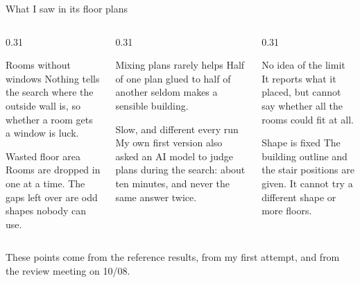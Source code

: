 \documentclass[9pt,aspectratio=169]{beamer}
\begin{document}
\begin{frame}{What I saw in its floor plans}
\begin{columns}[T]
\begin{column}{0.31\textwidth}
\begin{block}{Rooms without windows}
Nothing tells the search where the outside wall is, so whether a room gets a window is luck.
\end{block}
\begin{block}{Wasted floor area}
Rooms are dropped in one at a time. The gaps left over are odd shapes nobody can use.
\end{block}
\end{column}
\begin{column}{0.31\textwidth}
\begin{block}{Mixing plans rarely helps}
Half of one plan glued to half of another seldom makes a sensible building.
\end{block}
\begin{block}{Slow, and different every run}
My own first version also asked an AI model to judge plans during the search: about ten minutes, and never the same answer twice.
\end{block}
\end{column}
\begin{column}{0.31\textwidth}
\begin{block}{No idea of the limit}
It reports what it placed, but cannot say whether all the rooms could fit at all.
\end{block}
\begin{block}{Shape is fixed}
The building outline and the stair positions are given. It cannot try a different shape or more floors.
\end{block}
\end{column}
\end{columns}
\vspace{0.2cm}
{\small\color{muted} These points come from the reference results, from my first attempt, and from the review meeting on 10/08.}
\end{frame}
\end{document}
